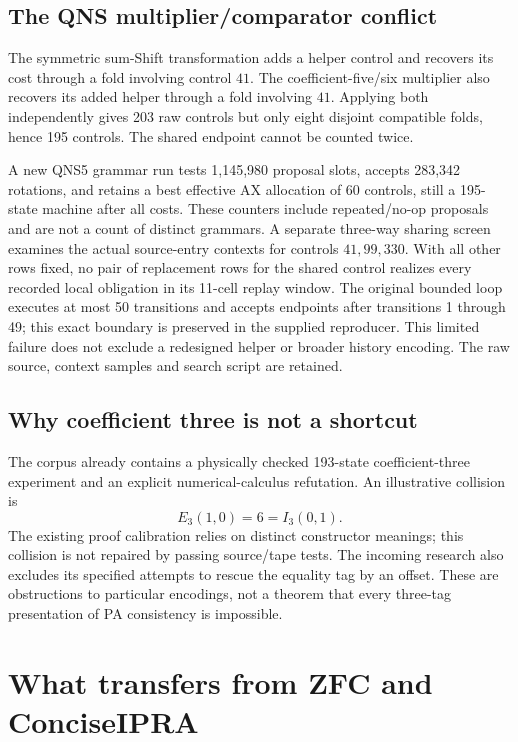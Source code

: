 \documentclass[11pt,letterpaper]{article}
\begin{document}
\subsection{The QNS multiplier/comparator conflict}

The symmetric sum-Shift transformation adds a helper control and recovers its
cost through a fold involving control $41$. The coefficient-five/six multiplier
also recovers its added helper through a fold involving $41$. Applying both
independently gives 203 raw controls but only eight disjoint compatible folds,
hence 195 controls. The shared endpoint cannot be counted twice.

A new QNS5 grammar run tests 1,145,980 proposal slots, accepts 283,342 rotations,
and retains a best effective AX allocation of 60 controls, still a 195-state
machine after all costs. These counters include repeated/no-op proposals and
are not a count of distinct grammars. A separate three-way sharing screen
examines the actual source-entry contexts for controls $41,99,330$. With all
other rows fixed, no pair of replacement rows for the shared control realizes
every recorded local obligation in its 11-cell replay window. The original
bounded loop executes at most 50 transitions and accepts endpoints after
transitions 1 through 49; this exact boundary is preserved in the supplied
reproducer.
This limited failure does not exclude a redesigned helper or broader history
encoding. The raw source, context samples and search script are retained.

\subsection{Why coefficient three is not a shortcut}

The corpus already contains a physically checked 193-state coefficient-three
experiment and an explicit numerical-calculus refutation. An illustrative
collision is
\[
 E_3(1,0)=6=I_3(0,1).
\]
The existing proof calibration relies on distinct constructor meanings;
this collision is not repaired by passing source/tape tests. The incoming
research also excludes its specified attempts to rescue the equality tag by
an offset. These are obstructions to particular encodings, not a theorem
that every three-tag presentation of PA consistency is impossible.

\section{What transfers from ZFC and ConciseIPRA}
\end{document}
